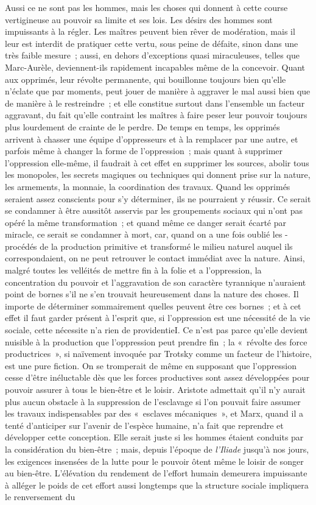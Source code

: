 \documentclass[french,twoside]{book} %
\begin{document}
Aussi ce ne sont pas les hommes, mais les choses qui donnent à cette course vertigineuse au pouvoir sa limite et ses lois. Les désirs des hommes sont impuissants à la régler. Les maîtres peuvent bien rêver de modération, mais il leur est interdit de pratiquer cette vertu, sous peine de défaite, sinon dans une très faible mesure ; aussi, en dehors d'exceptions quasi miraculeuses, telles que Marc-Aurèle, deviennent-ils rapidement incapables même de la concevoir. Quant aux opprimés, leur révolte permanente, qui bouillonne toujours bien qu'elle n'éclate que par moments, peut jouer de manière à aggraver le mal aussi bien que de manière à le restreindre ; et elle constitue surtout dans l'ensemble un facteur aggravant, du fait qu'elle contraint les maîtres à faire peser leur pouvoir toujours plus lourdement de crainte de le perdre. De temps en temps, les opprimés arrivent à chasser une équipe d'oppresseurs et à la remplacer par une autre, et parfois même à changer la forme de l'oppression ; mais quant à supprimer l'oppression elle-même, il faudrait à cet effet en supprimer les sources, abolir tous les monopoles, les secrets magiques ou techniques qui donnent prise sur la nature, les armements, la monnaie, la coordination des travaux. Quand les opprimés seraient assez conscients pour s'y déterminer, ils ne pourraient y réussir. Ce serait se condamner à être aussitôt asservis par les groupements sociaux qui n'ont pas opéré la même transformation ; et quand même ce danger serait écarté par miracle, ce serait se condamner à mort, car, quand on a une fois oublié les -procédés de la production primitive et transformé le milieu naturel auquel ils correspondaient, on ne peut retrouver le contact immédiat avec la nature. Ainsi, malgré toutes les velléités de mettre fin à la folie et a l'oppression, la concentration du pouvoir et l'aggravation de son caractère tyrannique n'auraient point de bornes s'il ne s'en trouvait heureusement dans la nature des choses. Il importe de déterminer sommairement quelles peuvent être ces bornes ; et à cet effet il faut garder présent à l'esprit que, si l'oppression est une nécessité de la vie sociale, cette nécessite n'a rien de providentieI. Ce n'est pas parce qu'elle devient nuisible à la production que l'oppression peut prendre fin ; la « révolte des force productrices », si naïvement invoquée par Trotsky comme un facteur de l'histoire, est une pure fiction. On se tromperait de même en supposant que l'oppression cesse d'être inéluctable dès que les forces productives sont assez développées pour pouvoir assurer à tous le bien-être et le loisir. Aristote admettait qu'il n'y aurait plus aucun obstacle à la suppression de l'esclavage si l'on pouvait faire assumer les travaux indispensables par des « esclaves mécaniques », et Marx, quand il a tenté d'anticiper sur l'avenir de l’espèce humaine, n'a fait que reprendre et développer cette conception. Elle serait juste si les hommes étaient conduits par la considération du bien-être ; mais, depuis l'époque de {\itshape l'Iliade} jusqu'à nos jours, les exigences insensées de la lutte pour le pouvoir ôtent même le loisir de songer au bien-être. L'élévation du rendement de l'effort humain demeurera impuissante à alléger le poids de cet effort aussi longtemps que la structure sociale impliquera le renversement du 
\end{document}
